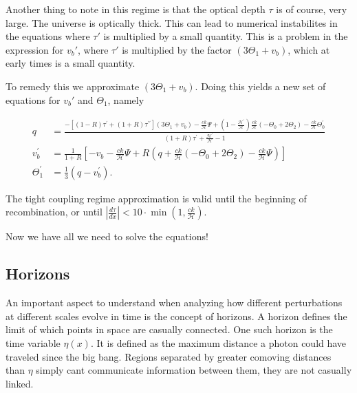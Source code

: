 \documentclass[12pt]{article}
\begin{document}
Another thing to note in this regime is that the optical depth $\tau$ is of course, very large. The universe is optically thick. This can lead to numerical instabilites in the equations where $\tau'$ is multiplied by a small quantity. This is a problem in the expression for $v_b'$, where $\tau'$ is multiplied by the factor $(3\Theta_1 + v_b)$, which at early times is a small quantity. 

To remedy this we approximate $(3\Theta_1 + v_b)$. Doing this yields a new set of equations for $v_b'$ and $\Theta_1$, namely 

\begin{equation}\begin{aligned}\label{eq: tight coupling regime dx}
    q &=\frac{-\left[(1-R) \tau^{\prime}+(1+R) \tau^{\prime \prime}\right]\left(3 \Theta_{1}+v_{b}\right)-\frac{c k}{\mathcal{H}} \Psi+\left(1-\frac{\mathcal{H}^{\prime}}{\mathcal{H}}\right) \frac{c k}{\mathcal{H}}\left(-\Theta_{0}+2 \Theta_{2}\right)-\frac{c k}{\mathcal{H}} \Theta_{0}^{\prime}}{(1+R) \tau^{\prime}+\frac{\mathcal{H}^{\prime}}{\mathcal{H}}-1} \\
    v_{b}^{\prime} &=\frac{1}{1+R}\left[-v_{b}-\frac{c k}{\mathcal{H}} \Psi+R\left(q+\frac{c k}{\mathcal{H}}\left(-\Theta_{0}+2 \Theta_{2}\right)-\frac{c k}{\mathcal{H}} \Psi\right)\right] \\
    \Theta_{1}^{\prime} &=\frac{1}{3}\left(q-v_{b}^{\prime}\right).
\end{aligned}\end{equation}

The tight coupling regime approximation is valid until the beginning of recombination, or until $\left|\frac{d \tau}{d x}\right|<10 \cdot \min \left(1, \frac{c k}{\mathcal{H}}\right)$.

Now we have all we need to solve the equations!

\subsection{Horizons}
An important aspect to understand when analyzing how different perturbations at different scales evolve in time is the concept of horizons. A horizon defines the limit of which points in space are casually connected. One such horizon is the time variable $\eta(x)$. It is defined as the maximum distance a photon could have traveled since the big bang. Regions separated by greater comoving distances than $\eta$ simply cant communicate information between them, they are not casually linked. 
\end{document}
